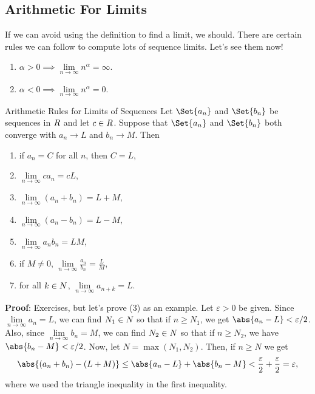 \subsection{Arithmetic For Limits}
If we can avoid using the definition to find a limit, we should.
There are certain rules we can follow to compute lots of sequence limits.
Let's see them now!
\begin{Theorem}{}{}
    \begin{enumerate}[(1)]
        \item $ \alpha>0\implies \lim\limits_{{n} \to {\infty}}n^\alpha=\infty $.
        \item $ \alpha<0\implies \lim\limits_{{n} \to {\infty}}n^\alpha=0 $.
    \end{enumerate}
\end{Theorem}
\begin{Theorem}{Arithmetic Rules for Limits of Sequences}{}
    Let $ \Set{a_n} $ and $ \Set{b_n} $ be sequences in $ \relax{R} $ and let $ c\in\relax{R} $.
    Suppose that $ \Set{a_n} $ and $ \Set{b_n} $ both converge with $ a_n\to L $ and $ b_n\to M $. Then
    \begin{enumerate}[(1)]
        \item if $ a_n=C $ for all $ n $, then $ C=L $,
        \item $ \lim\limits_{{n} \to {\infty}}c a_n=cL $,
        \item $ \lim\limits_{{n} \to {\infty}}(a_n+b_n)=L+M $,
        \item $ \lim\limits_{{n} \to {\infty}}(a_n-b_n)=L-M $,
        \item $ \lim\limits_{{n} \to {\infty}}a_n b_n=LM $,
        \item if $ M\ne 0 $, $ \lim\limits_{{n} \to {\infty}}\frac{a_n}{b_n}=\frac{L}{M} $,
        \item for all $ k\in \relax{N} $, $ \lim\limits_{{n} \to {\infty}}a_{n+k}=L $.
    \end{enumerate}
    \tcblower{}
    \textbf{Proof}: Exercises, but let's prove (3) as an example.
    Let $ \varepsilon>0 $ be given. Since $ \lim\limits_{{n} \to {\infty}}a_n=L $,
    we can find $ N_1\in \relax{N} $ so that if $ n\ge N_1 $,
    we get $ \abs{a_n-L}<\varepsilon/2 $. Also,
    since $ \lim\limits_{{n} \to {\infty}}b_n=M $, we can find $ N_2\in \relax{N} $
    so that if $ n\ge N_2 $, we have $ \abs{b_n-M}<\varepsilon/2 $.
    Now, let $ N=\max(N_1,N_2) $. Then, if $ n\ge N $
    we get
    \[ \abs{(a_n+b_n)-(L+M)}\le \abs{a_n-L}+\abs{b_n-M}<\frac{\varepsilon}{2}+\frac{\varepsilon}{2}=\varepsilon, \]
    where we used the triangle inequality in the first inequality.
\end{Theorem}
